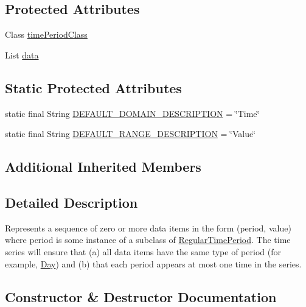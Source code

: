 \subsection*{Protected Attributes}
\begin{DoxyCompactItemize}
\item 
Class \mbox{\hyperlink{classorg_1_1jfree_1_1data_1_1time_1_1_time_series_a8451e52cd1e3aac5ee6bcd1f6e153a6f}{time\+Period\+Class}}
\item 
List \mbox{\hyperlink{classorg_1_1jfree_1_1data_1_1time_1_1_time_series_a1aec4f1b7f16cee23ea3b0a64649b69e}{data}}
\end{DoxyCompactItemize}
\subsection*{Static Protected Attributes}
\begin{DoxyCompactItemize}
\item 
static final String \mbox{\hyperlink{classorg_1_1jfree_1_1data_1_1time_1_1_time_series_aeca676d2ca4d1d3c5556f0ffff02aaf6}{D\+E\+F\+A\+U\+L\+T\+\_\+\+D\+O\+M\+A\+I\+N\+\_\+\+D\+E\+S\+C\+R\+I\+P\+T\+I\+ON}} = \char`\"{}Time\char`\"{}
\item 
static final String \mbox{\hyperlink{classorg_1_1jfree_1_1data_1_1time_1_1_time_series_a4928b2073cc17b0b62bc1cd3f4e6ce27}{D\+E\+F\+A\+U\+L\+T\+\_\+\+R\+A\+N\+G\+E\+\_\+\+D\+E\+S\+C\+R\+I\+P\+T\+I\+ON}} = \char`\"{}Value\char`\"{}
\end{DoxyCompactItemize}
\subsection*{Additional Inherited Members}


\subsection{Detailed Description}
Represents a sequence of zero or more data items in the form (period, value) where \textquotesingle{}period\textquotesingle{} is some instance of a subclass of \mbox{\hyperlink{classorg_1_1jfree_1_1data_1_1time_1_1_regular_time_period}{Regular\+Time\+Period}}. The time series will ensure that (a) all data items have the same type of period (for example, \mbox{\hyperlink{classorg_1_1jfree_1_1data_1_1time_1_1_day}{Day}}) and (b) that each period appears at most one time in the series. 

\subsection{Constructor \& Destructor Documentation}
\mbox{\label{classorg_1_1jfree_1_1data_1_1time_1_1_time_series_aa6b4c5301e09f6a1d4551a68a6c28ea9}} 
